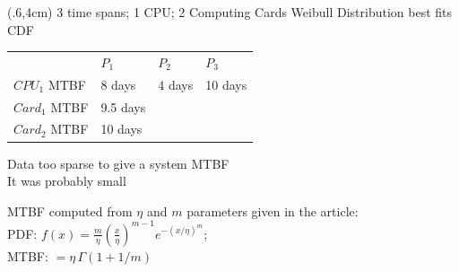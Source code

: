 \begin{frame}
  \begin{textblock*}{.45\linewidth}(.6\linewidth,4cm)
    {\small 3 time spans; 1 CPU; 2 Computing Cards}
    Weibull Distribution best fits CDF

    \medskip
    \begin{tabular}{llll}
                    & $P_1$    & $P_2$  & $P_3$ \\
      $CPU_1$ MTBF  & 8 days   & 4 days & 10 days\\
      $Card_1$ MTBF & 9.5 days &        & \\
      $Card_2$ MTBF & 10 days  &        & \\
    \end{tabular}

    \medskip
    {\scriptsize\textcolor{red!40}{Data too sparse to give a system MTBF}}\\
    {\scriptsize\textcolor{red!40}{It was probably small}}
        
    {\tiny MTBF computed from $\eta$ and $m$ parameters
      given in the article:\\
      PDF: $f(x) = \frac{m}{\eta}(\frac{x}{\eta})^{m-1}e^{-(x/\eta)^m}$;\\
      MTBF: $=\eta\, \Gamma(1+1/m)$}
    
  \end{textblock*}

%
\end{frame}

